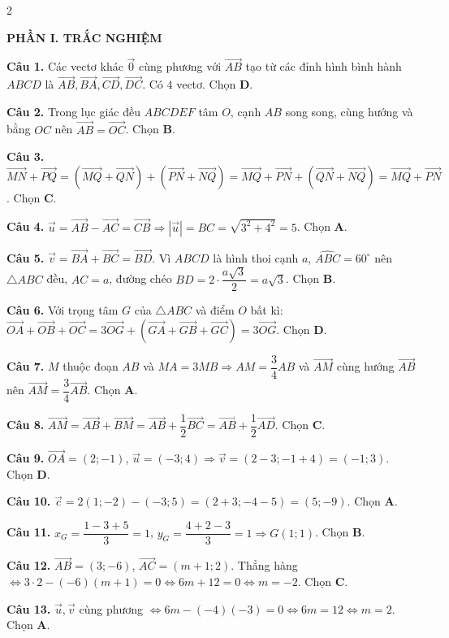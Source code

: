 \documentclass[10pt,a4paper]{article}
\begin{document}
\begin{multicols}{2}
\raggedcolumns
\small

\textbf{\color{accent}PHẦN I. TRẮC NGHIỆM}

\textbf{Câu 1.} Các vectơ khác $\vec{0}$ cùng phương với $\vec{AB}$ tạo từ các đỉnh hình bình hành $ABCD$ là $\vec{AB}, \vec{BA}, \vec{CD}, \vec{DC}$. Có $4$ vectơ. Chọn \textbf{D}.

\textbf{Câu 2.} Trong lục giác đều $ABCDEF$ tâm $O$, cạnh $AB$ song song, cùng hướng và bằng $OC$ nên $\vec{AB} = \vec{OC}$. Chọn \textbf{B}.

\textbf{Câu 3.} $\vec{MN} + \vec{PQ} = (\vec{MQ} + \vec{QN}) + (\vec{PN} + \vec{NQ}) = \vec{MQ} + \vec{PN} + (\vec{QN} + \vec{NQ}) = \vec{MQ} + \vec{PN}$. Chọn \textbf{C}.

\textbf{Câu 4.} $\vec{u} = \vec{AB} - \vec{AC} = \vec{CB} \Rightarrow |\vec{u}| = BC = \sqrt{3^2 + 4^2} = 5$. Chọn \textbf{A}.

\textbf{Câu 5.} $\vec{v} = \vec{BA} + \vec{BC} = \vec{BD}$. Vì $ABCD$ là hình thoi cạnh $a$, $\widehat{ABC} = 60^\circ$ nên $\triangle ABC$ đều, $AC = a$, đường chéo $BD = 2 \cdot \dfrac{a\sqrt{3}}{2} = a\sqrt{3}$. Chọn \textbf{B}.

\textbf{Câu 6.} Với trọng tâm $G$ của $\triangle ABC$ và điểm $O$ bất kì: $\vec{OA} + \vec{OB} + \vec{OC} = 3\vec{OG} + (\vec{GA} + \vec{GB} + \vec{GC}) = 3\vec{OG}$. Chọn \textbf{D}.

\textbf{Câu 7.} $M$ thuộc đoạn $AB$ và $MA = 3MB \Rightarrow AM = \dfrac{3}{4}AB$ và $\vec{AM}$ cùng hướng $\vec{AB}$ nên $\vec{AM} = \dfrac{3}{4}\vec{AB}$. Chọn \textbf{A}.

\textbf{Câu 8.} $\vec{AM} = \vec{AB} + \vec{BM} = \vec{AB} + \dfrac{1}{2}\vec{BC} = \vec{AB} + \dfrac{1}{2}\vec{AD}$. Chọn \textbf{C}.

\textbf{Câu 9.} $\vec{OA} = (2; -1)$, $\vec{u} = (-3; 4) \Rightarrow \vec{v} = (2 - 3; -1 + 4) = (-1; 3)$. Chọn \textbf{D}.

\textbf{Câu 10.} $\vec{c} = 2(1; -2) - (-3; 5) = (2 + 3; -4 - 5) = (5; -9)$. Chọn \textbf{A}.

\textbf{Câu 11.} $x_G = \dfrac{1 - 3 + 5}{3} = 1$, $y_G = \dfrac{4 + 2 - 3}{3} = 1 \Rightarrow G(1; 1)$. Chọn \textbf{B}.

\textbf{Câu 12.} $\vec{AB} = (3; -6)$, $\vec{AC} = (m + 1; 2)$. Thẳng hàng $\Leftrightarrow 3 \cdot 2 - (-6)(m + 1) = 0 \Leftrightarrow 6m + 12 = 0 \Leftrightarrow m = -2$. Chọn \textbf{C}.

\textbf{Câu 13.} $\vec{u}, \vec{v}$ cùng phương $\Leftrightarrow 6m - (-4)(-3) = 0 \Leftrightarrow 6m = 12 \Leftrightarrow m = 2$. Chọn \textbf{A}.


\end{multicols}
\end{document}
